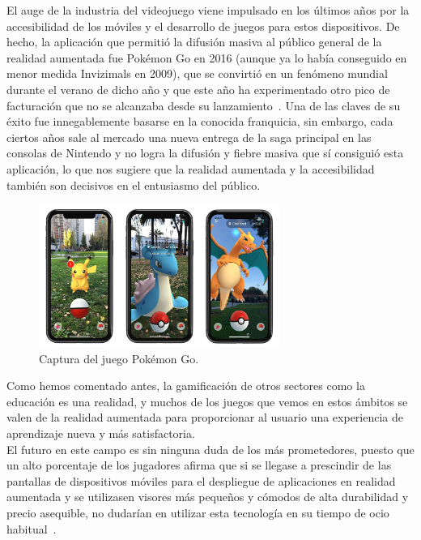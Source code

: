 El auge de la industria del videojuego viene impulsado en los últimos años por la accesibilidad de los móviles y el desarrollo de juegos para estos dispositivos. De hecho, la aplicación que permitió la difusión masiva al público general de la realidad aumentada fue Pokémon Go en 2016 (aunque ya lo había conseguido en menor medida Invizimals en 2009), que se convirtió en un fenómeno mundial durante el verano de dicho año y que este año ha experimentado otro pico de facturación que no se alcanzaba desde su lanzamiento~\cite{meristation_pokemonGo}. Una de las claves de su éxito fue innegablemente basarse en la conocida franquicia, sin embargo, cada ciertos años sale al mercado una nueva entrega de la saga principal en las consolas de Nintendo y no logra la difusión y fiebre masiva que sí consiguió esta aplicación, lo que nos sugiere que la realidad aumentada y la accesibilidad también son decisivos en el entusiasmo del público.\\

\begin{figure}[H]
     \centering
     \includegraphics[width=0.7\textwidth]{Images/pokemon-go-arplus-iphone-x.jpg}
     \caption[Captura del juego Pokémon Go]{Captura del juego Pokémon Go\footnotemark.}
     \label{fig:pokemonGo}
 \end{figure}

Como hemos comentado antes, la gamificación de otros sectores como la educación es una realidad, y muchos de los juegos que vemos en estos ámbitos se valen de la realidad aumentada para proporcionar al usuario una experiencia de aprendizaje nueva y más satisfactoria.\\

El futuro en este campo es sin ninguna duda de los más prometedores, puesto que un alto porcentaje de los jugadores afirma que si se llegase a prescindir de las pantallas de dispositivos móviles para el despliegue de aplicaciones en realidad aumentada y se utilizasen visores más pequeños y cómodos de alta durabilidad y precio asequible, no dudarían en utilizar esta tecnología en su tiempo de ocio habitual~\cite{caracolRadio}.

